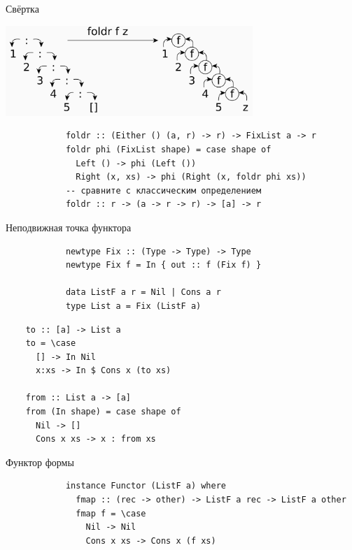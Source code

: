     \begin{frame}[fragile]{Свёртка}
        \pause
        \begin{center}
            \includegraphics[width=0.7\textwidth]{figs/foldr}
        \end{center}
        \pause
        \begin{verbatim}
            foldr :: (Either () (a, r) -> r) -> FixList a -> r
            foldr phi (FixList shape) = case shape of
              Left () -> phi (Left ())
              Right (x, xs) -> phi (Right (x, foldr phi xs))
            -- сравните с классическим определением
            foldr :: r -> (a -> r -> r) -> [a] -> r
        \end{verbatim}
    \end{frame}

    \begin{frame}[fragile]{Неподвижная точка функтора}
        \pause
        \begin{verbatim}
            newtype Fix :: (Type -> Type) -> Type
            newtype Fix f = In { out :: f (Fix f) }

            data ListF a r = Nil | Cons a r
            type List a = Fix (ListF a)
        \end{verbatim}
        \pause\vspace{1em}
        \begin{verbatim}
    to :: [a] -> List a
    to = \case
      [] -> In Nil
      x:xs -> In $ Cons x (to xs)

    from :: List a -> [a]
    from (In shape) = case shape of
      Nil -> []
      Cons x xs -> x : from xs
        \end{verbatim}
    \end{frame}

    \begin{frame}[fragile]{Функтор формы}
        \pause
        \begin{verbatim}
            instance Functor (ListF a) where
              fmap :: (rec -> other) -> ListF a rec -> ListF a other
              fmap f = \case
                Nil -> Nil
                Cons x xs -> Cons x (f xs)
        \end{verbatim}
    \end{frame}

